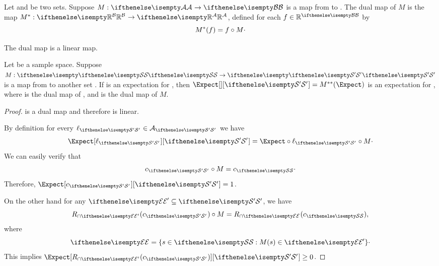 \begin{definition} 
    Let  and  be two sets.
    Suppose $\maps{a}{b}$ is a map from  to .
    The dual map of $M$ is the map $\mapsDual{b}{a}$, defined for each $f \in \field{R}^{\set{b}}$ by
    \begin{equation*}
        {M}^*(f) = f \circ M \cdot
    \end{equation*}
\end{definition}

\begin{proposition}
    The dual map is a linear map.
\end{proposition}

\begin{theorem}
    Let \sampleSet be a sample space.
    Suppose  $\maps{\sampleSet}{\sampleSetAlt}$ is a map from \sampleSet to another set \sampleSetAlt.
    If \Expect is an expectation for \sampleSet,
    then $\ExpAlt = \dualdualMap(\Expect)$ is an expectation for \sampleSetAlt,
    where \dualdualMap is the dual map of \dualMap, and \dualMap is the dual map of $M$.
\end{theorem}

\begin{proof}
    \dualdualMap is a dual map and therefore is linear.

    By definition for every $\act[\sampleSetAlt] \in \actionSet[\sampleSetAlt]$ we have
    \begin{equation*}
        \ExpAlt[{\act[\sampleSetAlt]}] = \Expect \circ \act[\sampleSetAlt] \circ M \cdot
    \end{equation*}
    We can easily verify that
    \begin{equation*}
        \sureAlt \circ M = \sure \cdot
    \end{equation*}
    Therefore, $\ExpAlt[\sureAlt] = 1$.

    On the other hand for any $\eventAlt \subseteq \sampleSetAlt$, we have
    \[
        \rstOp[\eventAlt](\sureAlt) \circ M = \rstOp(\sure),
    \]
    where
    \[
        \event = \{ s \in \sampleSet : M(s) \in \eventAlt \} \cdot
    \]
    This implies  $\ExpAlt[{\rstOp[\eventAlt](\sureAlt)}] \geq 0$.
\end{proof}
